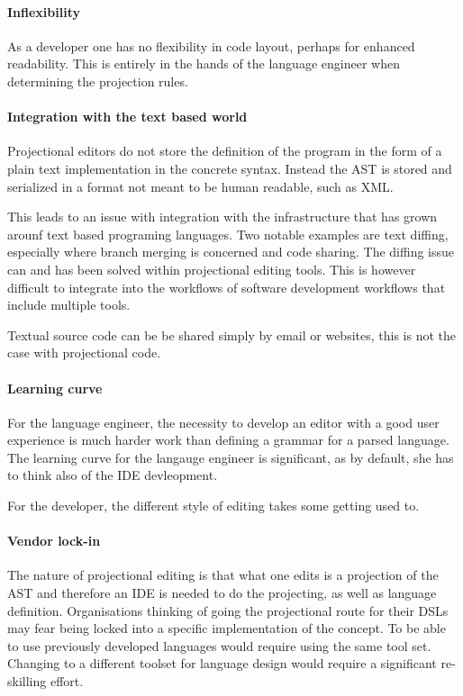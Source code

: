 \paragraph{Inflexibility}
As a developer one has no flexibility in code layout, perhaps for enhanced readability. 
This is entirely in the hands of the language engineer when determining the projection rules.

\paragraph{Integration with the text based world}
Projectional editors do not store the definition of the program in the form of a plain text implementation in the concrete syntax.
Instead the AST is stored and serialized in a format not meant to be human readable, such as XML.

This leads to an issue with integration with the infrastructure that has grown arounf text based programing languages.
Two notable examples are text diffing, especially where branch merging is concerned and code sharing.
The diffing issue can and has been solved within projectional editing tools.
This is however difficult to integrate into the workflows of software development workflows that include multiple tools.

Textual source code can be be shared simply by email or websites, this is not the case with projectional code.

\paragraph{Learning curve}
For the language engineer, the necessity to develop an editor with a good user experience is much harder work than defining a grammar for a parsed language.
The learning curve for the langauge engineer is significant, as by default, she has to think also of the IDE devleopment.

For the developer, the different style of editing takes some getting used to.

\paragraph{Vendor lock-in}
The nature of projectional editing is that what one edits is a projection of the AST and therefore an IDE is needed to do the projecting, as well as language definition.
Organisations thinking of going the projectional route for their DSLs may fear being locked into a specific implementation of the concept.
To be able to use previously developed languages would require using the same tool set. 
Changing to a different toolset for language design would require a significant re-skilling effort.





